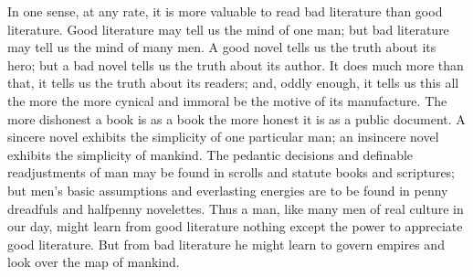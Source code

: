 In one sense, at any rate, it is more valuable to read bad literature than good literature. Good literature may tell us the mind of one man; but bad literature may tell us the mind of many men. A good novel tells us the truth about its hero; but a bad novel tells us the truth about its author. It does much more than that, it tells us the truth about its readers; and, oddly enough, it tells us this all the more the more cynical and immoral be the motive of its manufacture. The more dishonest a book is as a book the more honest it is as a public document. A sincere novel exhibits the simplicity of one particular man; an insincere novel exhibits the simplicity of mankind. The pedantic decisions and definable readjustments of man may be found in scrolls and statute books and scriptures; but men’s basic assumptions and everlasting energies are to be found in penny dreadfuls and halfpenny novelettes. Thus a man, like many men of real culture in our day, might learn from good literature nothing except the power to appreciate good literature. But from bad literature he might learn to govern empires and look over the map of mankind.

